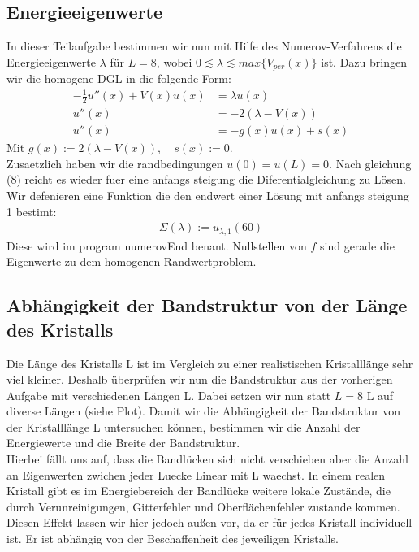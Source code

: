\documentclass[ngerman]{scrartcl}
\begin{document}
\subsection{Energieeigenwerte}
	In dieser Teilaufgabe bestimmen wir nun mit Hilfe des Numerov-Verfahrens die Energieeigenwerte $\lambda$ für $L = 8$,
	wobei $0 \lesssim \lambda \lesssim max \{V_{per}(x)\}$ ist.
	Dazu bringen wir die homogene DGL in die folgende Form:
	\begin{align*}
		-\frac{1}{2}u''(x)+V(x)u(x)&=\lambda u(x)\\
		u''(x)&=-2(\lambda-V(x))\\
		u''(x)&=- g(x) u(x)+s(x)
	\end{align*}
	Mit $g(x):= 2(\lambda-V(x)),\quad s(x):=0$.\\
	Zusaetzlich haben wir die randbedingungen $u(0) = u(L) = 0$.
	Nach gleichung (8) reicht es wieder fuer eine anfangs steigung die Diferentialgleichung zu Lösen.
	Wir defenieren eine Funktion die den endwert einer Lösung mit anfangs steigung 1 bestimt:
	\begin{align}
		\Sigma(\lambda):= u_{\lambda,1}(60)
	\end{align}
	Diese wird im program numerovEnd benant.
	Nullstellen von $f$ sind gerade die Eigenwerte zu dem homogenen Randwertproblem.
\subsection{Abhängigkeit der Bandstruktur von der Länge des Kristalls}
	Die Länge des Kristalls L ist im Vergleich zu einer realistischen Kristalllänge sehr viel kleiner.
	Deshalb überprüfen wir nun die Bandstruktur aus der vorherigen Aufgabe mit verschiedenen Längen L.
	Dabei setzen wir nun statt $L=8$ L auf diverse Längen (siehe Plot).
	Damit wir die Abhängigkeit der Bandstruktur von der Kristalllänge L untersuchen können, bestimmen wir die Anzahl der Energiewerte und die Breite der Bandstruktur.\\
	Hierbei fällt uns auf, dass die Bandlücken sich nicht verschieben aber die Anzahl an Eigenwerten zwichen jeder Luecke Linear mit L waechst.
	In einem realen Kristall gibt es im Energiebereich der Bandlücke weitere lokale Zustände, die durch Verunreinigungen, Gitterfehler und Oberflächenfehler zustande kommen.
	Diesen Effekt lassen wir hier jedoch außen vor, da er für jedes Kristall individuell ist.
	Er ist abhängig von der Beschaffenheit des jeweiligen Kristalls. 
\end{document}
